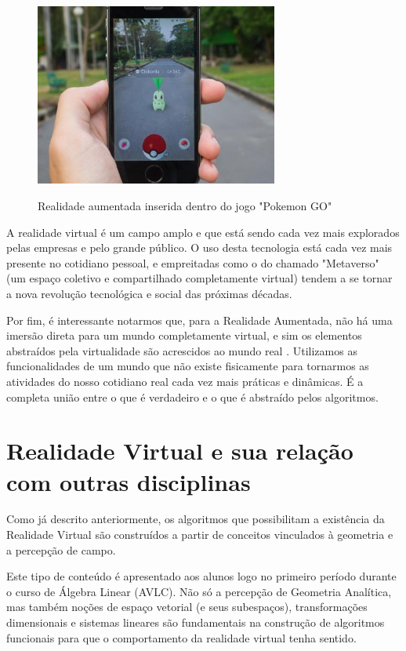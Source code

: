 \documentclass[a4paper, 12pt]{article}
\begin{document}
\begin{figure}[H]
    \centering
    \includegraphics[width=8cm]{imagens/pokemon go.jpg}
    \caption{Realidade aumentada inserida dentro do jogo "Pokemon GO"}
    \label{fig:my_label}
    \citep{pgo}
\end{figure}
A realidade virtual é um campo amplo e que está sendo cada vez mais explorados pelas empresas e pelo grande público. O uso desta tecnologia está cada vez mais presente no cotidiano pessoal, e empreitadas como o do chamado "Metaverso" (um espaço coletivo e compartilhado completamente virtual) tendem a se tornar a nova revolução tecnológica e social das próximas décadas.

Por fim, é interessante notarmos que, para a Realidade Aumentada, não há uma imersão direta para um mundo completamente virtual, e sim os elementos abstraídos pela virtualidade são acrescidos ao mundo real \citep{liberati2018}. Utilizamos as funcionalidades de um mundo que não existe fisicamente para tornarmos as atividades do nosso cotidiano real cada vez mais práticas e dinâmicas. É a completa união entre o que é verdadeiro e o que é abstraído pelos algoritmos. 

\section{Realidade Virtual e sua relação com outras disciplinas}
Como já descrito anteriormente, os algoritmos que possibilitam a existência da Realidade Virtual são construídos a partir de conceitos vinculados à geometria e a percepção de campo. 

Este tipo de conteúdo é apresentado aos alunos logo no primeiro período durante o curso de Álgebra Linear (AVLC). Não só a percepção de Geometria Analítica, mas também noções de espaço vetorial (e seus subespaços), transformações dimensionais e sistemas lineares são fundamentais na construção de algoritmos funcionais para que o comportamento da realidade virtual tenha sentido. 
\end{document}
